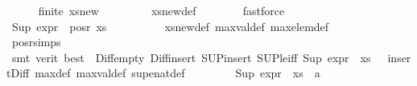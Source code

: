 \begin{isabellebody}
\ \ \ \ \isamarkupfalse%
\ {\isachardoublequoteopen}{\isasymnot}{\isacharparenleft}{\kern0pt}finite\ xs{\isacharunderscore}{\kern0pt}new{\isacharparenright}{\kern0pt}{\isachardoublequoteclose}\ \isanewline
\ \ \ \ \ \ \isamarkupfalse%
\ xs{\isacharunderscore}{\kern0pt}new{\isacharunderscore}{\kern0pt}def\isanewline
\ \ \ \ \ \ \isamarkupfalse%
\ fastforce\isanewline
\ \ \ \ \isamarkupfalse%
\ {\isachardoublequoteopen}Sup\ {\isacharparenleft}{\kern0pt}expr{\isacharunderscore}{\kern0pt}{}\ {\isacharbackquote}{\kern0pt}\ {\isacharparenleft}{\kern0pt}pos{\isacharunderscore}{\kern0pt}r\ xs{\isacharparenright}{\kern0pt}{\isacharparenright}{\kern0pt}\ {\isasymge}\ {\isasyminfinity}{\isachardoublequoteclose}\isanewline
\ \ \ \ \ \ \isamarkupfalse%
\ xs{\isacharunderscore}{\kern0pt}new{\isacharunderscore}{\kern0pt}def\ max{\isacharunderscore}{\kern0pt}val{\isacharunderscore}{\kern0pt}def\ max{\isacharunderscore}{\kern0pt}elem{\isacharunderscore}{\kern0pt}def\isanewline
\ \ \ \ \ \ \isamarkupfalse%
\ pos{\isacharunderscore}{\kern0pt}r{\isachardot}{\kern0pt}simps\isanewline
\ \ \ \ \ \ \isamarkupfalse%
\ {\isacharparenleft}{\kern0pt}smt\ {\isacharparenleft}{\kern0pt}verit{\isacharcomma}{\kern0pt}\ best{\isacharparenright}{\kern0pt}\ {\isachardoublequoteopen}{}{\isachardoublequoteclose}\ Diff{\isacharunderscore}{\kern0pt}empty\ Diff{\isacharunderscore}{\kern0pt}insert{}\ SUP{\isacharunderscore}{\kern0pt}insert\ SUP{\isacharunderscore}{\kern0pt}le{\isacharunderscore}{\kern0pt}iff\ {\isacartoucheopen}Sup\ {\isacharparenleft}{\kern0pt}expr{\isacharunderscore}{\kern0pt}{}\ {\isacharbackquote}{\kern0pt}\ xs{\isacharparenright}{\kern0pt}\ {\isacharequal}{\kern0pt}\ {\isasyminfinity}{\isacartoucheclose}\ insert{\isacharunderscore}{\kern0pt}Diff\ max{\isacharunderscore}{\kern0pt}def\ max{\isacharunderscore}{\kern0pt}val{\isacharunderscore}{\kern0pt}def\ sup{\isacharunderscore}{\kern0pt}enat{\isacharunderscore}{\kern0pt}def{\isacharparenright}{\kern0pt}\isanewline
\ \ \ \ \isamarkupfalse%
\ {}\ \isamarkupfalse%
\ {\isachardoublequoteopen}Sup\ {\isacharparenleft}{\kern0pt}expr{\isacharunderscore}{\kern0pt}{}\ {\isacharbackquote}{\kern0pt}\ {\isacharparenleft}{\kern0pt}xs\ {\isasymunion}\ {\isacharbraceleft}{\kern0pt}a{\isacharbraceright}{\kern0pt}{\isacharparenright}{\kern0pt}{\isacharparenright}{\kern0pt}\ {\isacharequal}{\kern0pt}\ {\isasyminfinity}{\isachardoublequoteclose}\isanewline

\end{isabellebody}

